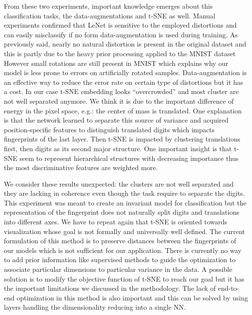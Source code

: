 \documentclass[a4paper,12pt]{report}
\newcommand{\eg}{e.g.}
\begin{document}
From these two experiments, important knowledge emerges about this classification tasks, the data-augmentations and t-SNE as well.
Manual experiments confirmed that LeNet is sensitive to the employed distortions and can easily misclassify if no form data-augmentation is used during training.
As previously said, nearly no natural distortion is present in the original dataset and this is partly due to the heavy prior processing applied to the MNIST dataset
However small rotations are still present in MNIST which explains why our model is less prone to errors on artificially rotated samples.
Data-augmentation is an effective way to reduce the error rate on certain type of distortions but it has a cost.
In our case t-SNE embedding looks ``overcrowded'' and most cluster are not well separated anymore.
We think it is due to the important difference of energy in the pixel space, \eg: the center of mass is translated.
One explanation is that the network learned to separate this source of variance and acquired position-specific features to distinguish translated digits which impacts fingerprints of the last layer.
Then t-SNE is impacted by clustering translations first, then digits as its second major structure.
One important insight is that t-SNE seem to represent hierarchical structures with decreasing importance thus the most discriminative features are weighted more.

We consider these results unexpected: the clusters are not well separated and they are lacking in coherence even though the task require to separate the digits.
This experiment was meant to create an invariant model for classification but the representation of the fingerprint does not naturally split digits and translations into different axes.
We have to repeat again that t-SNE is oriented towards visualization whose goal is not formally and universally well defined.
The current formulation of this method is to preserve distances between the fingerprints of our models which is not sufficient for our application.
There is currently no way to add prior information like supervised methods to guide the optimization to associate particular dimensions to particular variance in the data.
A possible solution is to modify the objective function of t-SNE to reach our goal but it has the important limitations we discussed in the methodology.
The lack of end-to-end optimization in this method is also important and this can be solved by using layers handling the dimensionality reducing into a single NN.
\end{document}
